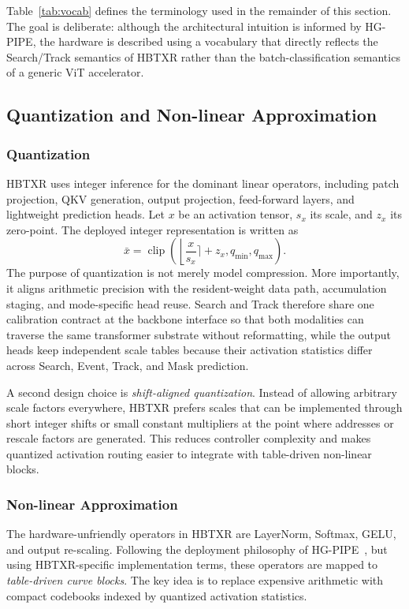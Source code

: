 \documentclass[journal]{IEEEtran}
\begin{document}
Table~\ref{tab:vocab} defines the terminology used in the remainder of this section. The goal is deliberate: although the architectural intuition is informed by HG-PIPE, the hardware is described using a vocabulary that directly reflects the Search/Track semantics of HBTXR rather than the batch-classification semantics of a generic ViT accelerator.

\subsection{Quantization and Non-linear Approximation}
\subsubsection{Quantization}
HBTXR uses integer inference for the dominant linear operators, including patch projection, QKV generation, output projection, feed-forward layers, and lightweight prediction heads. Let $x$ be an activation tensor, $s_x$ its scale, and $z_x$ its zero-point. The deployed integer representation is written as
\begin{equation}
\bar{x}=\operatorname{clip}\!\left(\left\lfloor \frac{x}{s_x}\rceil + z_x\right., q_{\min}, q_{\max}\right).
\end{equation}
The purpose of quantization is not merely model compression. More importantly, it aligns arithmetic precision with the resident-weight data path, accumulation staging, and mode-specific head reuse. Search and Track therefore share one calibration contract at the backbone interface so that both modalities can traverse the same transformer substrate without reformatting, while the output heads keep independent scale tables because their activation statistics differ across Search, Event, Track, and Mask prediction.

A second design choice is \emph{shift-aligned quantization}. Instead of allowing arbitrary scale factors everywhere, HBTXR prefers scales that can be implemented through short integer shifts or small constant multipliers at the point where addresses or rescale factors are generated. This reduces controller complexity and makes quantized activation routing easier to integrate with table-driven non-linear blocks.

\subsubsection{Non-linear Approximation}
The hardware-unfriendly operators in HBTXR are LayerNorm, Softmax, GELU, and output re-scaling. Following the deployment philosophy of HG-PIPE~\cite{ref11}, but using HBTXR-specific implementation terms, these operators are mapped to \emph{table-driven curve blocks}. The key idea is to replace expensive arithmetic with compact codebooks indexed by quantized activation statistics.
\end{document}

